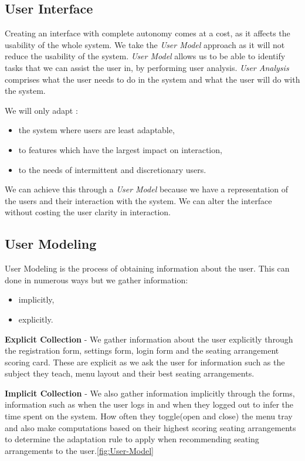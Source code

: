 \subsection{User Interface}
Creating an interface with complete autonomy comes at a cost, as it affects the usability of the whole system.  We take the \emph{User Model} approach as it will not reduce the usability of the system. \emph{User Model} allows us to be able to identify tasks that we can assist the user in, by performing user analysis. \emph{User Analysis} comprises what the user needs to do in the system and what the user will do with the system.

We will only adapt :
\begin{itemize}
    \item the system where users are least adaptable,
    \item to features which have the largest impact on interaction,
    \item to the needs of intermittent and discretionary users. \cite{benyon1993adaptive} 
\end{itemize}

We can achieve this through a \emph{User Model} because we have a representation of the users and their interaction with the system. We can alter the interface without costing the user clarity in interaction.


\subsection{User Modeling}
User Modeling is the process of obtaining information about the user. This can done in numerous ways but we gather information:
\begin{itemize}
    \item  implicitly,
    \item  explicitly.
\end{itemize}

\textbf{Explicit Collection} - We gather information about the user explicitly through the registration form, settings form, login form and the seating arrangement scoring card. These are explicit as we ask the user for information such as the subject they teach, menu layout and their best seating arrangements.

\textbf{Implicit Collection} - We also gather information implicitly through the forms, information such as when the user logs in and when they logged out to infer the time spent on the system. How often they toggle(open and close) the menu tray and also make computations based on their highest scoring seating arrangements to determine the adaptation rule to apply when recommending seating arrangements to the user.\ref{fig:User-Model}

